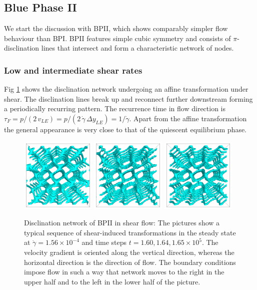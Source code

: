 \documentclass[aps,pre,reprint,superscriptaddress]{revtex4}
\newcommand{\e}[1]{\times10^{#1}}
\newcommand{\gd}{\dot{\gamma}}
\begin{document}
\subsection{Blue Phase II}

We start the discussion with BPII, which shows comparably simpler flow behaviour than BPI.
BPII features simple cubic symmetry and consists of $\pi$-disclination lines that 
intersect and form a characteristic network of nodes.

\subsubsection{Low and intermediate shear rates}

Fig \ref{bp2-med} shows the disclination network 
undergoing an affine transformation under shear. The disclination lines break up and 
reconnect further downstream forming a periodically recurring pattern. 
The recurrence time in flow direction is $\tau_F=p/(2\, v_{LE})=p/(2\,\gd\, \Delta y_{LE})= 1/\gd$.
Apart from the affine transformation the general appearance is very close to that 
of the quiescent equilibrium phase.

\begin{figure}[h]
\includegraphics[width=0.32\textwidth]{disc-160k_run902.png}
\includegraphics[width=0.32\textwidth]{disc-164k_run902.png}
\includegraphics[width=0.32\textwidth]{disc-165k_run902.png}
\caption{Disclination network of BPII in shear flow: The pictures show a typical sequence 
of shear-induced transformations in the steady state at 
$\gd=1.56\e{-4}$ and time steps $t=1.60, 1.64,1.65\e{5}$. The velocity gradient 
is oriented along the vertical direction, whereas the horizontal direction is the direction of flow. 
The boundary conditions impose flow in such a way that network moves 
to the right in the upper half and to the left in the lower half of the picture.}
\label{bp2-med}
\end{figure}
\end{document}
